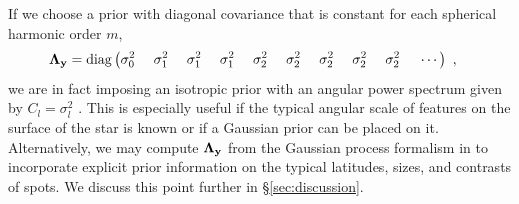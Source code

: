 \documentclass[modern]{aastex631}
\begin{document}
%
If we choose a prior with diagonal covariance that is constant for each spherical harmonic order $m$,
%
\begin{align}
    \boldsymbol{\Lambda}_\bvec{y} & =
    \mathrm{diag} \left(
    \sigma_0^2
    \quad\quad\quad\quad
    \sigma_1^2
    \quad\quad\quad\quad
    \sigma_1^2
    \quad\quad\quad\quad
    \sigma_1^2
    \quad\quad\quad\quad
    \sigma_2^2
    \quad\quad\quad\quad
    \sigma_2^2
    \quad\quad\quad\quad
    \sigma_2^2
    \quad\quad\quad\quad
    \sigma_2^2
    \quad\quad\quad\quad
    \sigma_2^2
    \quad\quad\quad\quad
    \cdots
    \right)
    \quad,
\end{align}
%
we are in fact imposing an isotropic prior with an angular power spectrum given by $C_l = \sigma_l^2$
\citep[e.g.,][]{Baldi2006}. 
This is especially useful if the typical angular scale of features on the surface of the star is known or if a Gaussian prior can be placed on it.
Alternatively, we may compute $\boldsymbol{\Lambda}_{\mathbf{y}}$ from the Gaussian process formalism in \citet{Luger2021b} to incorporate explicit prior information on the typical latitudes, sizes, and contrasts of spots. We discuss this point further in \S\ref{sec:discussion}.
\end{document}
